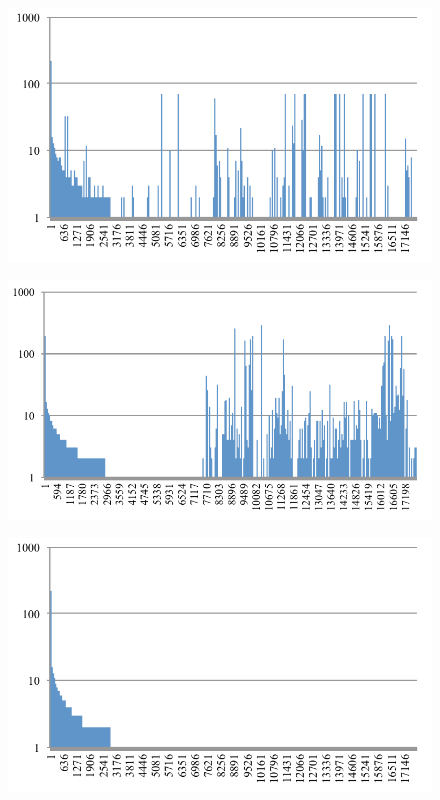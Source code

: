 \documentclass[conference]{IEEEtran}
\begin{document}
\begin{figure}[bt]
\begin{minipage}[b]{0.48\linewidth}
    \label{fig:asm-5gram-DR-histogram}%
  \end{minipage}
  \begin{minipage}[b]{0.48\linewidth}
    \includegraphics[clip,width=1.0\columnwidth]{images/IRR_ASM}%
    \label{fig:asm-5gram-IRR-histogram}%
  \end{minipage}\vspace{0.5cm}
  \begin{minipage}[b]{0.48\linewidth}
    \includegraphics[clip,width=1.0\columnwidth]{images/MLI_ASM}%
    \label{fig:asm-5gram-MLI-histogram}%
  \end{minipage}
  \begin{minipage}[b]{0.48\linewidth}
    \includegraphics[clip,width=1.0\columnwidth]{images/PG_ASM}%

\end{minipage}
\end{figure}
\end{document}
